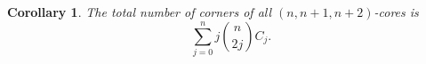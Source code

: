 \documentclass[a4paper,12pt]{article}
\def \remark {\noindent \emph{Remark. }}
\newtheorem{cor}[thm]{Corollary}
\newtheorem{exam}[thm]{\it Example}
\begin{document}
\begin{cor}
    The total number of corners of all $(n,n+1,n+2)$-cores is
  \begin{equation} \label{3multiCoreCorner}
    \sum_{j= 0 }^n  j {n \choose 2j} C_{j}.
  \end{equation}
\end{cor}

%



%
%
%
%
%
%
%
%
\end{document}
